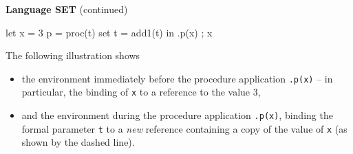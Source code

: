 \begin{minipage}[t]{\sw}
\slidenumber
\LARGE
{\bf Language SET} (continued)
\begin{qv}
let
  x = 3
  p = proc(t) set t = add1(t)
in
  { .p(x) ; x }
\end{qv}
The following illustration shows
\begin{itemize}
\item
the environment immediately before
the procedure application \verb'.p(x)' --
in particular, the binding of \verb'x' to a reference to the value 3,
\item
and the environment during the procedure application \verb'.p(x)',
binding the formal parameter \verb't'
to a {\em new} reference 
containing a copy of the value of \verb'x'
(as shown by the dashed line).
\end{itemize}
\end{minipage}
\clearpage
